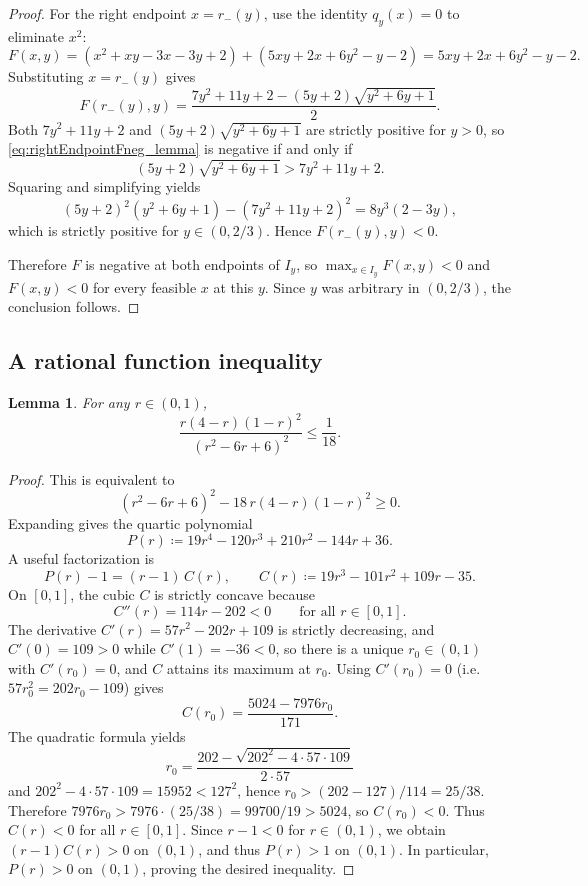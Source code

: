 \documentclass[11pt]{article}
\newtheorem{lemma}[theorem]{Lemma}
\begin{document}
\begin{proof}
For the right endpoint $x=r_-(y)$, use the identity $q_y(x)=0$ to eliminate $x^2$:
\[
F(x,y)=(x^2+xy-3x-3y+2) + (5xy+2x+6y^2-y-2)=5xy+2x+6y^2-y-2.
\]
Substituting $x=r_-(y)$ gives
\begin{equation}\label{eq:rightEndpointFneg_lemma}
F(r_-(y),y)=\frac{7y^2+11y+2-(5y+2)\sqrt{y^2+6y+1}}{2}.
\end{equation}
Both $7y^2+11y+2$ and $(5y+2)\sqrt{y^2+6y+1}$ are strictly positive for $y>0$,
so \eqref{eq:rightEndpointFneg_lemma} is negative if and only if
\[
(5y+2)\sqrt{y^2+6y+1}>7y^2+11y+2.
\]
Squaring and simplifying yields
\begin{equation}\label{eq:squareDiffFneg_lemma}
(5y+2)^2(y^2+6y+1)-(7y^2+11y+2)^2
=8y^3(2-3y),
\end{equation}
which is strictly positive for $y\in(0,2/3)$. Hence $F(r_-(y),y)<0$.

Therefore $F$ is negative at both endpoints of $I_y$, so $\max_{x\in I_y}F(x,y)<0$ and
$F(x,y)<0$ for every feasible $x$ at this $y$. Since $y$ was arbitrary in $(0,2/3)$, the conclusion follows.
\end{proof}
\subsection{A rational function inequality}
\begin{lemma}\label{lem: rational function bound-TOBECHECKED}
For any $r\in(0,1)$, 
\[ \frac{r(4-r)(1-r)^2}{(r^2-6r+6)^2}\le \frac{1}{18}.
\]
\end{lemma}
\begin{proof}
This is equivalent to
\[
(r^2-6r+6)^2 - 18\,r(4-r)(1-r)^2 \ge 0.
\]
Expanding gives the quartic polynomial
\[
P(r)\coloneqq 19r^4-120r^3+210r^2-144r+36.
\]
A useful factorization is
\[
P(r)-1=(r-1)\,C(r),
\qquad
C(r)\coloneqq 19r^3-101r^2+109r-35.
\]
On $[0,1]$, the cubic $C$ is strictly concave because
\[
C''(r)=114r-202<0\qquad\text{for all }r\in[0,1].
\]
The derivative $C'(r)=57r^2-202r+109$ is strictly decreasing, and $C'(0)=109>0$ while $C'(1)=-36<0$,
so there is a unique $r_0\in(0,1)$ with $C'(r_0)=0$, and $C$ attains its maximum at $r_0$.
Using $C'(r_0)=0$ (i.e.\ $57r_0^2=202r_0-109$) gives
\[
C(r_0)=\frac{5024-7976r_0}{171}.
\]
The quadratic formula yields
\[
r_0=\frac{202-\sqrt{202^2-4\cdot 57\cdot 109}}{2\cdot 57}
\]
and $202^2-4\cdot 57\cdot 109=15952<127^2$, hence $r_0>(202-127)/114=25/38$.
Therefore $7976r_0>7976\cdot(25/38)=99700/19>5024$, so $C(r_0)<0$.
Thus $C(r)<0$ for all $r\in[0,1]$. Since $r-1<0$ for $r\in(0,1)$, we obtain $(r-1)C(r)>0$ on $(0,1)$,
and thus $P(r)>1$ on $(0,1)$. In particular, $P(r)>0$ on $(0,1)$, proving the desired inequality.
\end{proof}
\end{document}
